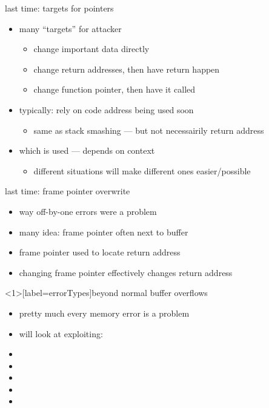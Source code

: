 \begin{frame}{last time: targets for pointers}
    \begin{itemize}
    \item many ``targets'' for attacker
        \begin{itemize}
            \item change important data directly
            \item change return addresses, then have return happen
            \item change function pointer, then have it called
        \end{itemize}
    \item typically: rely on code address being used soon
        \begin{itemize}
            \item same as stack smashing --- but not necessairily return address
        \end{itemize}
    \item which is used --- depends on context
        \begin{itemize}
            \item different situations will make different ones easier/possible
        \end{itemize}
    \end{itemize}
\end{frame}

\begin{frame}{last time: frame pointer overwrite}
    \begin{itemize}
        \item way off-by-one errors were a problem
        \item many idea: frame pointer often next to buffer
        \item frame pointer used to locate return address
        \item changing frame pointer effectively changes return address
    \end{itemize}
\end{frame}

\begin{frame}<1>[label=errorTypes]{beyond normal buffer overflows}
    \begin{itemize}
    \item pretty much every memory error is a problem
    \item will look at exploiting:
    \item {}
    \item {}
    \item {}
    \item {}
    \item {}
    \end{itemize}
\end{frame}


